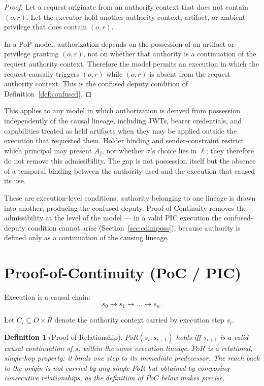 \documentclass[11pt]{article}
\newtheorem{definition}{Definition}
\begin{document}
\begin{proof}
Let a request originate from an authority context that does not contain
$(o,r)$. Let the executor hold another authority context, artifact, or ambient
privilege that does contain $(o,r)$.

In a PoP model, authorization depends on the possession of an artifact or
privilege granting $(o,r)$, not on whether that authority is a continuation of
the request authority context. Therefore the model permits an execution in
which the request causally triggers $(o,r)$ while $(o,r)$ is absent from the
request authority context. This is the confused deputy condition of
Definition~\ref{def:confused}.
\end{proof}

This applies to any model in which authorization is derived from possession
independently of the causal lineage, including JWTs, bearer credentials, and
capabilities treated as held artifacts when they may be applied outside the
execution that requested them. Holder binding and sender-constraint restrict
which principal may present $A_j$, not whether $\sigma$'s choice lies in $\ell$;
they therefore do not remove this admissibility. The gap is not possession itself
but the absence of a temporal binding between the authority used and the execution
that caused its use.

These are execution-level conditions: authority belonging to one lineage is drawn
into another, producing the confused deputy. Proof-of-Continuity removes the
admissibility at the level of the model --- in a valid PIC execution the
confused-deputy condition cannot arise (Section~\ref{sec:cdimposs}), because
authority is defined only as a continuation of the causing lineage.

\section{Proof-of-Continuity (PoC / PIC)}
\label{sec:poc}

Execution is a causal chain:
\[
s_0 \rightarrow s_1 \rightarrow \dots \rightarrow s_n.
\]

Let $C_i \subseteq O \times R$ denote the authority context carried by execution
step $s_i$.

\begin{definition}[Proof of Relationship]
$PoR(s_i, s_{i+1})$ holds iff $s_{i+1}$ is a valid causal continuation of $s_i$
within the same execution lineage. $PoR$ is a \emph{relational}, single-hop
property: it binds one step to its immediate predecessor. The reach back to the
origin is not carried by any single $PoR$ but obtained by composing consecutive
relationships, as the definition of $PoC$ below makes precise.
\end{definition}
\end{document}
